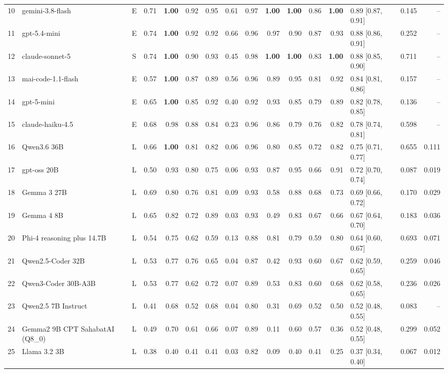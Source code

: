 \begin{table}[t]
\begin{tabular}{@{}r l c rrrrrrrr r r l r r@{}}
    10 & gemini-3.8-flash & E & 0.71 & \textbf{1.00} & 0.92 & 0.95 & 0.61 & 0.97 & \textbf{1.00} & \textbf{1.00} & 0.86 & \textbf{1.00} & 0.89 [0.87, 0.91] & 0.145 & -- \\
    11 & gpt-5.4-mini & E & 0.74 & \textbf{1.00} & 0.92 & 0.92 & 0.66 & 0.96 & 0.97 & 0.90 & 0.87 & 0.93 & 0.88 [0.86, 0.91] & 0.252 & -- \\
    12 & claude-sonnet-5 & S & 0.74 & \textbf{1.00} & 0.90 & 0.93 & 0.45 & 0.98 & \textbf{1.00} & \textbf{1.00} & 0.83 & \textbf{1.00} & 0.88 [0.85, 0.90] & 0.711 & -- \\
    13 & mai-code-1.1-flash & E & 0.57 & \textbf{1.00} & 0.87 & 0.89 & 0.56 & 0.96 & 0.89 & 0.95 & 0.81 & 0.92 & 0.84 [0.81, 0.86] & 0.157 & -- \\
    14 & gpt-5-mini & E & 0.65 & \textbf{1.00} & 0.85 & 0.92 & 0.40 & 0.92 & 0.93 & 0.85 & 0.79 & 0.89 & 0.82 [0.78, 0.85] & 0.136 & -- \\
    15 & claude-haiku-4.5 & E & 0.68 & 0.98 & 0.88 & 0.84 & 0.23 & 0.96 & 0.86 & 0.79 & 0.76 & 0.82 & 0.78 [0.74, 0.81] & 0.598 & -- \\
    \midrule
    16 & Qwen3.6 36B & L & 0.66 & \textbf{1.00} & 0.81 & 0.82 & 0.06 & 0.96 & 0.80 & 0.85 & 0.72 & 0.82 & 0.75 [0.71, 0.77] & 0.655 & 0.111 \\
    17 & gpt-oss 20B & L & 0.50 & 0.93 & 0.80 & 0.75 & 0.06 & 0.93 & 0.87 & 0.95 & 0.66 & 0.91 & 0.72 [0.70, 0.74] & 0.087 & 0.019 \\
    18 & Gemma 3 27B & L & 0.69 & 0.80 & 0.76 & 0.81 & 0.09 & 0.93 & 0.58 & 0.88 & 0.68 & 0.73 & 0.69 [0.66, 0.72] & 0.170 & 0.029 \\
    19 & Gemma 4 8B & L & 0.65 & 0.82 & 0.72 & 0.89 & 0.03 & 0.93 & 0.49 & 0.83 & 0.67 & 0.66 & 0.67 [0.64, 0.70] & 0.183 & 0.036 \\
    20 & Phi-4 reasoning plus 14.7B & L & 0.54 & 0.75 & 0.62 & 0.59 & 0.13 & 0.88 & 0.81 & 0.79 & 0.59 & 0.80 & 0.64 [0.60, 0.67] & 0.693 & 0.071 \\
    21 & Qwen2.5-Coder 32B & L & 0.53 & 0.77 & 0.76 & 0.65 & 0.04 & 0.87 & 0.42 & 0.93 & 0.60 & 0.67 & 0.62 [0.59, 0.65] & 0.259 & 0.046 \\
    22 & Qwen3-Coder 30B-A3B & L & 0.53 & 0.77 & 0.62 & 0.72 & 0.07 & 0.89 & 0.53 & 0.83 & 0.60 & 0.68 & 0.62 [0.58, 0.65] & 0.236 & 0.026 \\
    23 & Qwen2.5 7B Instruct & L & 0.41 & 0.68 & 0.52 & 0.68 & 0.04 & 0.80 & 0.31 & 0.69 & 0.52 & 0.50 & 0.52 [0.48, 0.55] & 0.083 & -- \\
    24 & Gemma2 9B CPT SahabatAI (Q8\_0) & L & 0.49 & 0.70 & 0.61 & 0.66 & 0.07 & 0.89 & 0.11 & 0.60 & 0.57 & 0.36 & 0.52 [0.48, 0.55] & 0.299 & 0.052 \\
    25 & Llama 3.2 3B & L & 0.38 & 0.40 & 0.41 & 0.41 & 0.03 & 0.82 & 0.09 & 0.40 & 0.41 & 0.25 & 0.37 [0.34, 0.40] & 0.067 & 0.012 \\
    \bottomrule
  \end{tabular}
\end{table}
